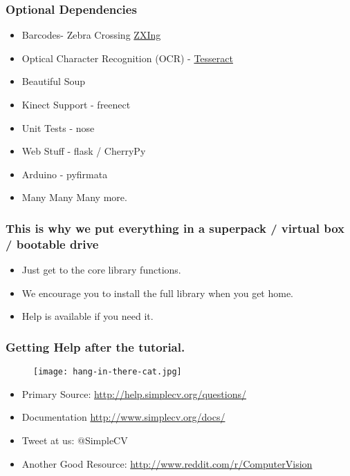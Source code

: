 \documentclass[compress]{beamer}
\begin{document}

\begin{frame}
  \frametitle{Optional Dependencies}
  \begin{itemize}
  \item Barcodes- Zebra Crossing \href{https://code.google.com/p/zxing/}{ZXIng}
  \item Optical Character Recognition (OCR) - \href{https://code.google.com/p/tesseract-ocr/}{Tesseract}
  \item Beautiful Soup 
  \item Kinect Support - freenect 
  \item Unit Tests - nose
  \item Web Stuff - flask / CherryPy
  \item Arduino - pyfirmata
  \item Many Many Many more. 
  \end{itemize}
\end{frame}


\begin{frame}
  \frametitle{This is why we put everything in a superpack / virtual
    box / bootable drive}
  \begin{itemize}
  \item Just get to the core library functions.
  \item We encourage you to install the full library when you get
    home.
  \item Help is available if you need it. 
  \end{itemize}
\end{frame}

\begin{frame}
\frametitle{Getting Help after the tutorial.}
\begin{figure}
  \texttt{[image: hang-in-there-cat.jpg]}
\end{figure}
\begin{itemize}
  \item Primary Source: \url{http://help.simplecv.org/questions/}
  \item Documentation \url{http://www.simplecv.org/docs/}
  \item Tweet at us: $@$Simple\textunderscore CV
  \item Another Good Resource: \url{http://www.reddit.com/r/ComputerVision}
\end{itemize}
\end{frame}
\end{document}
